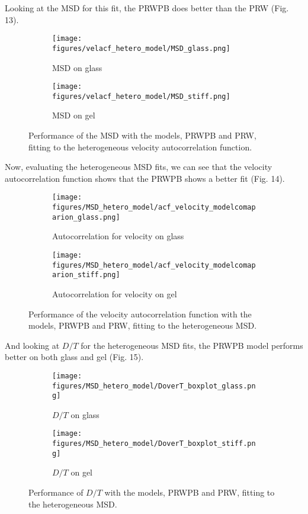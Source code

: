 \documentclass[12pt]{article}
\begin{document}
Looking at the MSD for this fit, the PRWPB does better than the PRW (Fig. 13).

\begin{figure}[h!]
  \centering
  \begin{subfigure}[b]{0.4\linewidth}
    \texttt{[image: figures/velacf\_hetero\_model/MSD\_glass.png]}
    \caption{MSD on glass}
  \end{subfigure}
  \begin{subfigure}[b]{0.4\linewidth}
    \texttt{[image: figures/velacf\_hetero\_model/MSD\_stiff.png]}
    \caption{MSD on gel}
  \end{subfigure}
  \caption{Performance of the MSD with the models, PRWPB and PRW, fitting to the heterogeneous velocity autocorrelation function.}
\end{figure}

Now, evaluating the heterogeneous MSD fits, we can see that the velocity autocorrelation function shows that the PRWPB shows a better fit (Fig. 14).

\begin{figure}[h!]
  \centering
  \begin{subfigure}[b]{0.4\linewidth}
    \texttt{[image: figures/MSD\_hetero\_model/acf\_velocity\_modelcomaparion\_glass.png]}
    \caption{Autocorrelation for velocity on glass}
  \end{subfigure}
  \begin{subfigure}[b]{0.4\linewidth}
    \texttt{[image: figures/MSD\_hetero\_model/acf\_velocity\_modelcomaparion\_stiff.png]}
    \caption{Autocorrelation for velocity on gel}
  \end{subfigure}
  \caption{Performance of the velocity autocorrelation function with the models, PRWPB and PRW, fitting to the heterogeneous MSD.}
\end{figure}

And looking at $D/T$ for the heterogeneous MSD fits, the PRWPB model performs better on both glass and gel (Fig. 15).

\begin{figure}[h!]
  \centering
  \begin{subfigure}[b]{0.4\linewidth}
    \texttt{[image: figures/MSD\_hetero\_model/DoverT\_boxplot\_glass.png]}
    \caption{$D/T$ on glass}
  \end{subfigure}
  \begin{subfigure}[b]{0.4\linewidth}
    \texttt{[image: figures/MSD\_hetero\_model/DoverT\_boxplot\_stiff.png]}
    \caption{$D/T$ on gel}
  \end{subfigure}
  \caption{Performance of $D/T$ with the models, PRWPB and PRW, fitting to the heterogeneous MSD.}
\end{figure}
\end{document}
